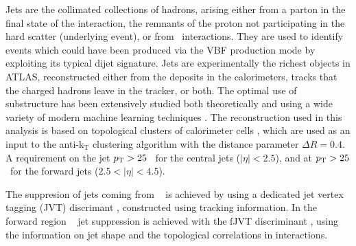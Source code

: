Jets are the collimated collections of hadrons, arising either
from a parton in the final state of the interaction, the remnants
of the proton not participating in the hard scatter (underlying event),
or from \pileup~interactions. They are used to identify events
which could have been produced via the VBF production mode by
exploiting its typical dijet signature. Jets are experimentally the richest
objects in ATLAS, reconstructed either from the deposits in the
calorimeters, tracks that the charged hadrons leave in the tracker,
or both. The optimal use of substructure has been extensively
studied both theoretically \cite{Altheimer:2012mn} and using
a wide variety of modern machine learning techniques \cite{Larkoski:2017jix}.
The reconstruction used in this analysis is based on topological
clusters of calorimeter cells \cite{Aad:2016upy}, which are used as
an input to the anti-k$_\text{T}$ clustering algorithm
\cite{Cacciari:2008gp, Cacciari:2011ma} with the distance parameter
$\Delta R = 0.4$. A requirement on the jet $p_{\text{T}} > 25$ \GeV~for the
central jets ($|\eta| < 2.5$), and at $p_{\text{T}} > 25$ \GeV~for the forward
jets ($2.5 < |\eta| < 4.5$).

The suppresion of jets coming from \pileup~ is achieved by using a
dedicated jet vertex tagging (JVT) discrimant \cite{ATLAS-CONF-2014-018},
constructed using tracking information. In the forward region \pileup~
jet suppression is achieved with the fJVT discriminant \cite{Aaboud:2017pou},
using the information on jet shape and the topological correlations in
\pileup interactions.

